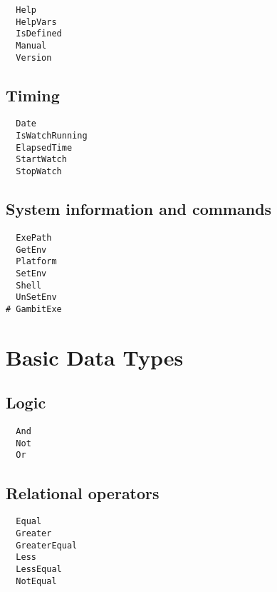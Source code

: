 \begin{multicols}{3}
\begin{verbatim}
  Help 
  HelpVars 
  IsDefined
  Manual 
  Version 
\end{verbatim}
\end{multicols}


\subsection{Timing}

\begin{multicols}{3}
\begin{verbatim}
  Date 
  IsWatchRunning 
  ElapsedTime 
  StartWatch 
  StopWatch 
\end{verbatim}
\end{multicols}

\subsection{System information and commands}

\begin{multicols}{3}
\begin{verbatim}
  ExePath 
  GetEnv 
  Platform 
  SetEnv 
  Shell 
  UnSetEnv 
# GambitExe 
\end{verbatim}
\end{multicols}

\section{Basic Data Types}

\subsection{Logic}

\begin{multicols}{3}
\begin{verbatim}
  And 
  Not 
  Or 
\end{verbatim}
\end{multicols}

\subsection{Relational operators}

\begin{multicols}{3}
\begin{verbatim}
  Equal 
  Greater 
  GreaterEqual 
  Less 
  LessEqual 
  NotEqual 
\end{verbatim}
\end{multicols}

